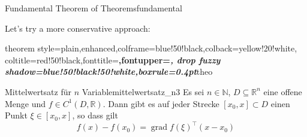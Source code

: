 \begin{dispExample}
\begin{Theorem}[enhanced,
    fuzzy halo=3mm with yellow,
    fuzzy halo=2mm with red,
    fuzzy halo=1mm with yellow,
    watermark color=red!35!white,
    watermark text={Overacting\\Fundamental Theorem}]%
  {Fundamental Theorem of Theorems}{fundamental}%
  \lipsum[1-2]
\end{Theorem}
\end{dispExample}

Let's try a more conservative approach:

\begin{dispExample}
%
  {theorem style=plain,enhanced,colframe=blue!50!black,colback=yellow!20!white,
   coltitle=red!50!black,fonttitle=\upshape\bfseries,fontupper=\itshape,
   drop fuzzy shadow=blue!50!black!50!white,boxrule=0.4pt}{theo}

\begin{YetAnotherTheorem}{Mittelwertsatz f\"{u}r $n$ Variable}{mittelwertsatz_n3}%
  Es sei $n\in\mathbb{N}$, $D\subseteq\mathbb{R}^n$ eine offene Menge und
  $f\in C^{1}(D,\mathbb{R})$. Dann gibt es auf jeder Strecke
  $[x_0,x]\subset D$ einen Punkt $\xi\in[x_0,x]$, so dass gilt
  \begin{equation*}
  f(x)-f(x_0) = \operatorname{grad} f(\xi)^{\top}(x-x_0)
  \end{equation*}
\end{YetAnotherTheorem}
\end{dispExample}

